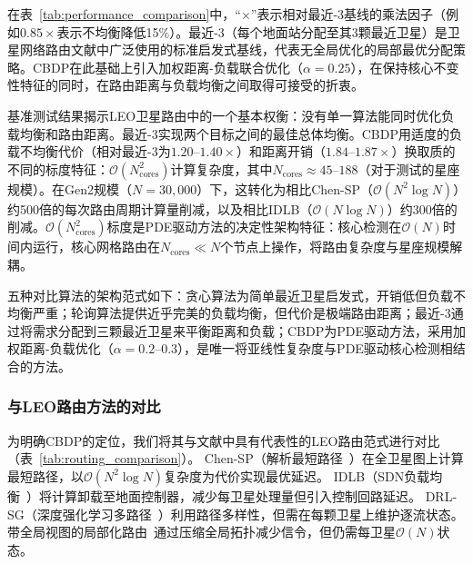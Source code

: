 \documentclass[sn-nature,pdflatex]{sn-jnl}
\begin{document}
在表~\ref{tab:performance_comparison}中，“$\times$”表示相对最近-3基线的乘法因子（例如$0.85\times$表示不均衡降低15\%）。最近-3（每个地面站分配至其3颗最近卫星）是卫星网络路由文献中广泛使用的标准启发式基线，代表无全局优化的局部最优分配策略。CBDP在此基础上引入加权距离-负载联合优化（$\alpha=0.25$），在保持核心不变性特征的同时，在路由距离与负载均衡之间取得可接受的折衷。

基准测试结果揭示LEO卫星路由中的一个基本权衡：没有单一算法能同时优化负载均衡和路由距离。最近-3实现两个目标之间的最佳总体均衡。CBDP用适度的负载不均衡代价（相对最近-3为$1.20$--$1.40\times$）和距离开销（$1.84$--$1.87\times$）换取质的不同的标度特征：$\mathcal{O}(N_{\text{cores}}^2)$计算复杂度，其中$N_{\text{cores}} \approx 45$--$188$（对于测试的星座规模）。在Gen2规模（$N=30,000$）下，这转化为相比Chen-SP（$\mathcal{O}(N^2\log N)$）约500倍的每次路由周期计算量削减，以及相比IDLB（$\mathcal{O}(N\log N)$）约300倍的削减。$\mathcal{O}(N_{\text{cores}}^2)$标度是PDE驱动方法的决定性架构特征：核心检测在$\mathcal{O}(N)$时间内运行，核心网格路由在$N_{\text{cores}} \ll N$个节点上操作，将路由复杂度与星座规模解耦。

五种对比算法的架构范式如下：贪心算法为简单最近卫星启发式，开销低但负载不均衡严重；轮询算法提供近乎完美的负载均衡，但代价是极端路由距离；最近-3通过将需求分配到三颗最近卫星来平衡距离和负载；CBDP为PDE驱动方法，采用加权距离-负载优化（$\alpha=0.2$--$0.3$），是唯一将亚线性复杂度与PDE驱动核心检测相结合的方法。

\subsubsection{与LEO路由方法的对比}

为明确CBDP的定位，我们将其与文献中具有代表性的LEO路由范式进行对比（表~\ref{tab:routing_comparison}）。
Chen-SP（解析最短路径~\cite{chen_2024_jsac}）在全卫星图上计算最短路径，以$\mathcal{O}(N^2\log N)$复杂度为代价实现最优延迟。
IDLB（SDN负载均衡~\cite{roth_2025_idlb,papa_2020}）将计算卸载至地面控制器，减少每卫星处理量但引入控制回路延迟。
DRL-SG（深度强化学习多路径~\cite{li_2025_tmc}）利用路径多样性，但需在每颗卫星上维护逐流状态。
带全局视图的局部化路由~\cite{yan_2024_galor}通过压缩全局拓扑减少信令，但仍需每卫星$\mathcal{O}(N)$状态。
\end{document}
